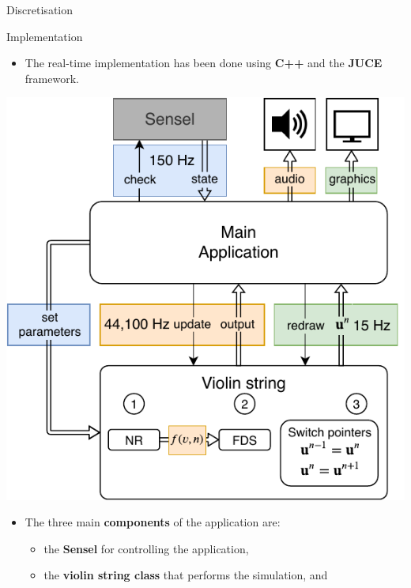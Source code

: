 \documentclass[a0paper,portrait]{baposter}
\let\oldbf\textbf
\renewcommand{\textbf}[1]{\textcolor{aaublue1}{\oldbf{#1}}}
\begin{document}
\begin{poster}
\begin{posterbox}[name=discretisation, column=1, below=elasto2,above=bottom]{Discretisation}
\end{posterbox}

\begin{posterbox}[name=implementation,column=2,row=0]{Implementation}

\begin{itemize}
    \item The real-time implementation has been done using \textbf{C++} and the \textbf{JUCE} framework.
\end{itemize}
\begin{center}
    \includegraphics[width=1.0\columnwidth]{systemArchitecture.pdf}
    \label{fig:systemArch}
\end{center}
\begin{itemize}
    \item The three main \textbf{components} of the application are:
    \begin{itemize}
        \item the \textbf{Sensel} for controlling the application,
        \item the \textbf{violin string class} that performs the simulation, and

\end{itemize}
\end{itemize}
\end{posterbox}
\end{poster}
\end{document}
